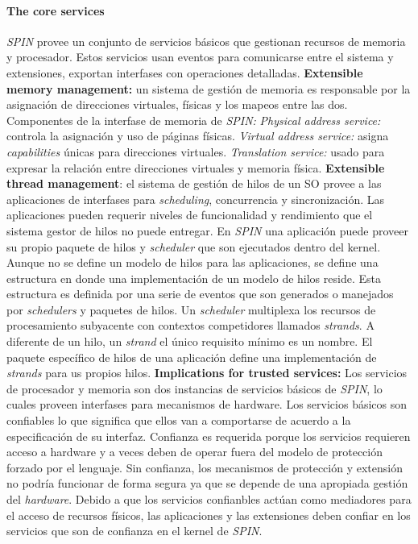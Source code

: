 \paragraph{\textnormal{\textbf{The core services}}}
\textit{SPIN} provee un conjunto de servicios básicos que gestionan recursos de memoria y procesador. Estos servicios usan eventos para comunicarse entre el sistema y extensiones, exportan interfases con operaciones detalladas. \textbf{Extensible memory management:} un sistema de gestión de memoria es responsable por la asignación de direcciones virtuales, físicas y los mapeos entre las dos. Componentes de la interfase de memoria de \textit{SPIN:} \textit{Physical address service:} controla la asignación y uso de páginas físicas. \textit{Virtual address service:} asigna \textit{capabilities} únicas para direcciones virtuales. \textit{Translation service:} usado para expresar la relación entre direcciones virtuales y memoria física. \textbf{Extensible thread management}: el sistema de gestión de hilos de un SO provee a las aplicaciones de interfases para \textit{scheduling}, concurrencia y sincronización. Las aplicaciones pueden requerir niveles de funcionalidad y rendimiento que el sistema gestor de hilos no puede entregar. En \textit{SPIN} una aplicación puede proveer su propio paquete de hilos y \textit{scheduler} que son ejecutados dentro del kernel. Aunque no se define un modelo de hilos para las aplicaciones, se define una estructura en donde una implementación de un modelo de hilos reside. Esta estructura es definida por una serie de eventos que son generados o manejados por \textit{schedulers} y paquetes de hilos. Un \textit{scheduler} multiplexa los recursos de procesamiento subyacente con contextos competidores llamados \textit{strands}. A diferente de un hilo, un \textit{strand} el único requisito mínimo es un nombre. El paquete específico de hilos de una aplicación define una implementación de \textit{strands} para us propios hilos. \textbf{Implications for trusted services:} Los servicios de procesador y memoria son dos instancias de servicios básicos de \textit{SPIN}, lo cuales proveen interfases para mecanismos de hardware. Los servicios básicos son confiables lo que significa que ellos van a comportarse de acuerdo a la especificación de su interfaz. Confianza es requerida porque los servicios requieren acceso a hardware y a veces deben de operar fuera del modelo de protección forzado por el lenguaje. Sin confianza, los mecanismos de protección y extensión no podría funcionar de forma segura ya que se depende de una apropiada gestión del \textit{hardware}. Debido a que los servicios confianbles actúan como mediadores para el acceso de recursos físicos, las aplicaciones y las extensiones deben confiar en los servicios que son de confianza en el kernel de \textit{SPIN}.

